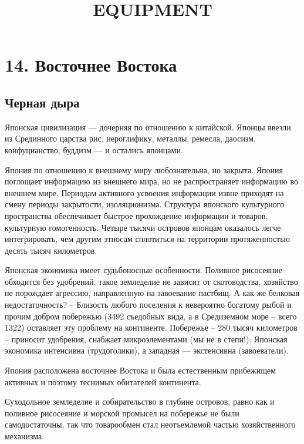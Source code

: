 \documentclass[a4paper]{article}
\title{EQUIPMENT}
\begin{document}
\clearpage\setcounter{page}{1}\pagestyle{Standard}
\section[14.
\textcyrillic{В}\textcyrillic{о}\textcyrillic{с}\textcyrillic{т}\textcyrillic{о}\textcyrillic{ч}\textcyrillic{н}\textcyrillic{е}\textcyrillic{е}
\textcyrillic{В}\textcyrillic{о}\textcyrillic{с}\textcyrillic{т}\textcyrillic{о}\textcyrillic{к}\textcyrillic{а}]{\foreignlanguage{russian}{14.
Восточнее Востока}}
\subsection[{\textquotedbl}Черная дыра{\textquotedbl}]{ {\textquotedbl}Черная
дыра{\textquotedbl}}
{
Японская цивилизация — дочерняя по отношению к китайской. Японцы ввезли из Срединного царства рис, иероглифику, металлы,
ремесла, даосизм, конфуцианство, буддизм — и остались японцами. }

{
Япония по отношению к внешнему миру любознательна, но закрыта. Япония поглощает информацию из внешнего мира, но не
распространяет информацию во внешнем мире. Периодам активного усвоения информации извне приходят на смену периоды
закрытости, изоляционизма. Структура японского культурного пространства обеспечивает быстрое прохождение информации и
товаров, культурную гомогенность. Четыре тысячи островов японцам оказалось легче интегрировать, чем другим этносам
сплотиться на территории протяженностью десять тысяч километров. \ }

{
Японская экономика имеет судьбоносные особенности. Поливное рисосеяние обходится без удобрений, такое земледелие не
зависит от скотоводства, хозяйство не порождает агрессию, направленную на завоевание пастбищ. А как же белковая
недостаточность? – Близость любого поселения к невероятно богатому рыбой и прочим добром побережью (3492 съедобных
вида, а в Средиземном море – всего 1322) оставляет эту проблему на континенте. Побережье – 280 тысяч километров –
приносит удобрения, снабжает микроэлементами (мы не в степи!). Японская экономика интенсивна (трудоголики), а западная
— экстенсивна (завоеватели). }

{
Япония расположена {\textquotedbl}восточнее Востока{\textquotedbl} и была естественным прибежищем активных и поэтому
теснимых обитателей континента. }

{
Суходольное земледелие и собирательство в глубине островов, равно как и поливное рисосеяние и морской промысел на
побережье не были самодостаточны, так что товарообмен стал неотъемлемой частью хозяйственного механизма.}
\end{document}
